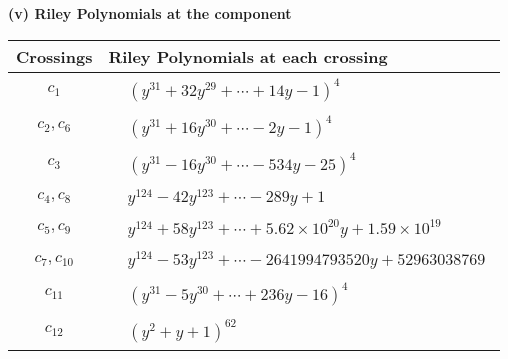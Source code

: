 \documentclass[1p]{elsarticle_modified}
\theoremstyle{definition}
\begin{document}
\newpage\renewcommand{\arraystretch}{1}
\flushleft \textbf{(v) Riley Polynomials at the component}\newline \\
\begin{tabular}{m{50pt}|m{274pt}}
Crossings & \hspace{64pt}Riley Polynomials at each crossing \\
\hline $$\begin{aligned}c_{1}\end{aligned}$$&$\begin{aligned}
&(y^{31}+32 y^{29}+\cdots+14 y-1)^{4}
\end{aligned}$\\
\hline $$\begin{aligned}c_{2},c_{6}\end{aligned}$$&$\begin{aligned}
&(y^{31}+16 y^{30}+\cdots-2 y-1)^{4}
\end{aligned}$\\
\hline $$\begin{aligned}c_{3}\end{aligned}$$&$\begin{aligned}
&(y^{31}-16 y^{30}+\cdots-534 y-25)^{4}
\end{aligned}$\\
\hline $$\begin{aligned}c_{4},c_{8}\end{aligned}$$&$\begin{aligned}
&y^{124}-42 y^{123}+\cdots-289 y+1
\end{aligned}$\\
\hline $$\begin{aligned}c_{5},c_{9}\end{aligned}$$&$\begin{aligned}
&y^{124}+58 y^{123}+\cdots+5.62\times10^{20} y+1.59\times10^{19}
\end{aligned}$\\
\hline $$\begin{aligned}c_{7},c_{10}\end{aligned}$$&$\begin{aligned}
&y^{124}-53 y^{123}+\cdots-2641994793520 y+52963038769
\end{aligned}$\\
\hline $$\begin{aligned}c_{11}\end{aligned}$$&$\begin{aligned}
&(y^{31}-5 y^{30}+\cdots+236 y-16)^{4}
\end{aligned}$\\
\hline $$\begin{aligned}c_{12}\end{aligned}$$&$\begin{aligned}
&(y^2+y+1)^{62}
\end{aligned}$\\
\hline
\end{tabular}\\~\\
\end{document}
